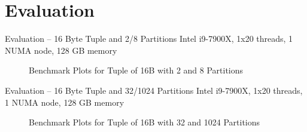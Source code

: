 \section{Evaluation}
\begin{frame}{Evaluation -- \LARGE 16 Byte Tuple and 2/8 Partitions}
  Intel i9-7900X, 1x20 threads, 1 NUMA node, 128 GB memory

  \begin{figure}[h]
    \centering
    \begin{subfigure}{.49\textwidth}
      \centering
      \resizebox{\linewidth}{!}{}
    \end{subfigure}
    \begin{subfigure}{.49\textwidth}
      \centering
      \resizebox{\linewidth}{!}{}
    \end{subfigure}
    \begin{subfigure}{\textwidth}
      \centering
      \resizebox{.85\linewidth}{!}{}
    \end{subfigure}
    \caption[Shuffle Benchmark Plots for Tuple of 16B with 2 and 8 Partitions]{Benchmark Plots for Tuple of 16B with 2 and 8 Partitions}
    \label{plot-shuffle-16B-2-8}
  \end{figure}
\end{frame}

\begin{frame}{Evaluation -- \LARGE 16 Byte Tuple and 32/1024 Partitions}
  Intel i9-7900X, 1x20 threads, 1 NUMA node, 128 GB memory
  \begin{figure}[h]
    \centering
    \begin{subfigure}{.49\textwidth}
      \centering
      \resizebox{\linewidth}{!}{}
    \end{subfigure}
    \begin{subfigure}{.49\textwidth}
      \centering
      \resizebox{\linewidth}{!}{}
    \end{subfigure}
    \begin{subfigure}{\textwidth}
      \centering
      \resizebox{.85\linewidth}{!}{}
    \end{subfigure}
    \caption[Shuffle Benchmark Plots for Tuple of 16B with 32 and 1024 Partitions]{Benchmark Plots for Tuple of 16B with 32 and 1024 Partitions}
    \label{plot-shuffle-16B-32-1024}
  \end{figure}
\end{frame}


